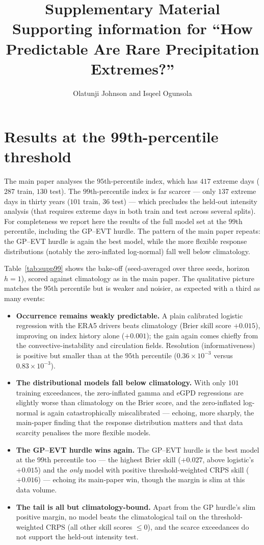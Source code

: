 \documentclass[11pt,a4paper]{article}
\title{\bfseries Supplementary Material\\[0.3em]
\large Supporting information for ``How Predictable Are Rare Precipitation Extremes?''}
\author{Olatunji Johnson and Isqeel Ogunsola}
\date{}
\begin{document}
\maketitle

\section{Results at the 99th-percentile threshold}
\label{sec:supp99}

The main paper analyses the $95$th-percentile index, which has $417$ extreme days
($287$ train, $130$ test). The $99$th-percentile index is far scarcer --- only
$137$ extreme days in thirty years ($101$ train, $36$ test) --- which precludes
the held-out intensity analysis (that requires extreme days in both train and
test across several splits). For completeness we report here the results of the
full model set at the $99$th percentile, including the GP--EVT hurdle. The
pattern of the main paper repeats: the GP--EVT hurdle is again the best model,
while the more flexible response distributions (notably the zero-inflated
log-normal) fall well below climatology.

Table~\ref{tab:supp99} shows the bake-off (seed-averaged over three seeds, horizon
$h=1$), scored against climatology as in the main paper. The qualitative picture
matches the $95$th percentile but is weaker and noisier, as expected with a third
as many events:
\begin{itemize}
\item \textbf{Occurrence remains weakly predictable.} A plain calibrated logistic
regression with the ERA5 drivers beats climatology (Brier skill score
$+0.015$), improving on index history alone ($+0.001$); the gain again comes
chiefly from the convective-instability and circulation fields. Resolution
(informativeness) is positive but smaller than at the $95$th percentile
($0.36\times10^{-3}$ versus $0.83\times10^{-3}$).
\item \textbf{The distributional models fall below climatology.} With only $101$
training exceedances, the zero-inflated gamma and eGPD regressions are slightly
worse than climatology on the Brier score, and the zero-inflated log-normal is
again catastrophically miscalibrated --- echoing, more sharply, the main-paper
finding that the response distribution matters and that data scarcity penalises
the more flexible models.
\item \textbf{The GP--EVT hurdle wins again.} The GP--EVT
hurdle is the best model at the $99$th percentile too --- the highest Brier skill
($+0.027$, above logistic's $+0.015$) and the \emph{only} model with positive
threshold-weighted CRPS skill ($+0.016$) --- echoing its main-paper win, though
the margin is slim at this data volume.
\item \textbf{The tail is all but climatology-bound.} Apart from the GP
hurdle's slim positive margin, no model beats the climatological tail on the
threshold-weighted CRPS (all other skill scores $\le 0$), and the scarce
exceedances do not support the held-out intensity test.
\end{itemize}
\end{document}
